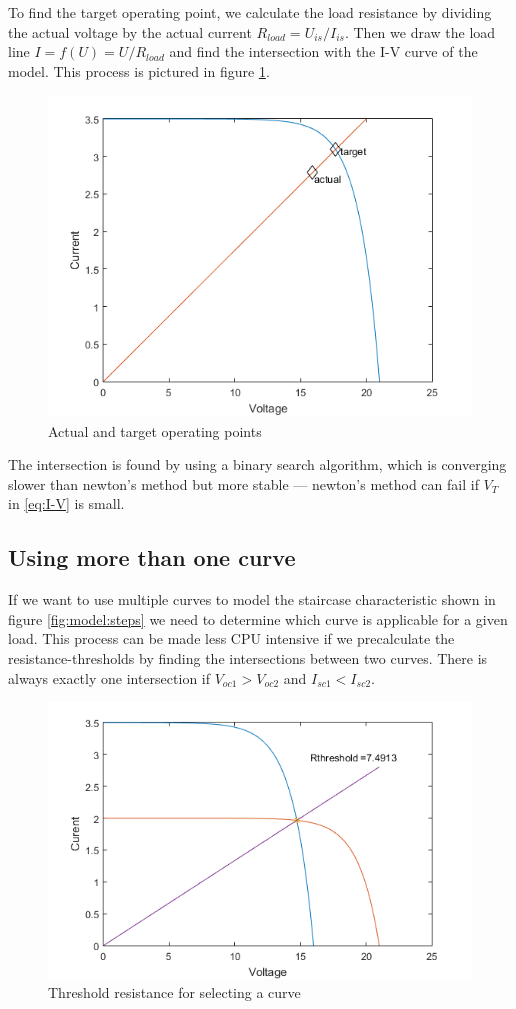 To find the target operating point, we calculate the load resistance by dividing
the actual voltage by the actual current $R_{load} = U_{is}  /  I_{is}$. Then we
draw the load line $I = f(U) =  U / R_{load}$ and find the intersection with the
I-V   curve   of   the   model.   This   process   is   pictured    in    figure
\ref{fig:model:approx}.
\begin{figure}[h]
	\center
    \includegraphics[width=.75\textwidth]{images/model/approx.png}
    \caption{Actual and target operating points}
    \label{fig:model:approx}
\end{figure}
The  intersection  is found  by  using  a  binary  search  algorithm,  which  is
converging slower than newton's method but more  stable  --- newton's method can
fail if $V_T$ in \eqref{eq:I-V} is small.


\subsection{Using more than one curve}

If we want to use multiple curves to model the staircase characteristic shown in
figure \ref{fig:model:steps} we  need to determine which curve is applicable for
a given load. This process can be made less CPU intensive if we precalculate the
resistance-thresholds by finding the intersections between two curves.  There is
always exactly one intersection if  $V_{oc1} > V_{oc2}$ and $I_{sc1} < I_{sc2}$.
\begin{figure}[h]
	\center
    \includegraphics[width=.75\textwidth]{images/model/threshold.png}
    \caption{Threshold resistance for selecting a curve}
    \label{fig:model:threshold}
\end{figure}

